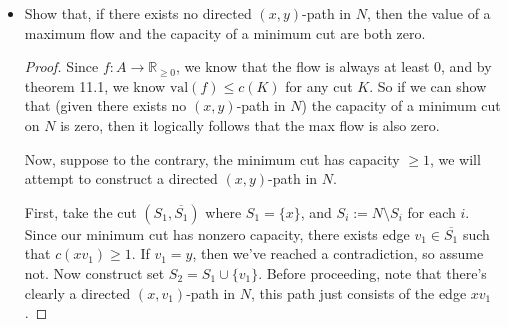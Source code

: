 \documentclass[11pt]{article}
\newcommand{\R}{\mathbb{R}}
\newcommand{\sm}{\scriptsize}
\newcommand\itm[1]{\item[\textbf{#1}]}
\newcommand{\n}{\vspace{0.3cm}}
\begin{document}
\begin{itemize}
\begin{enumerate}[label=(\alph*)]
\begin{center}
{
        }
      \end{center}
    \end{enumerate} \n



  \itm{11.2.2} Show that, if there exists no directed \((x, y)\)-path in \(N\), then the value of a maximum flow and the capacity of a minimum cut are both zero.
  \begin{proof}
    Since \(f \colon A \to \R_{\geq 0}\), we know that the flow is always at least 0, and by theorem 11.1, we know \(\text{val}(f) \leq c(K)\) for any cut \(K\).  So if we can show that (given there exists no \((x,y)\)-path in \(N\)) the capacity of a minimum cut on \(N\) is zero, then it logically follows that the max flow is also zero. \n

    Now, suppose to the contrary, the minimum cut has capacity \(\geq 1\), we will attempt to construct a directed \((x,y)\)-path in \(N\). \n

  First, take the cut \(\left(S_1, \overline{S_1}\right)\) where \(S_1 = \{x\}\), and \(S_i := N \setminus S_i\) for each \(i\).  Since our minimum cut has nonzero capacity, there exists edge \(v_1 \in \overline{S_1}\) such that \(c(xv_1) \geq 1\).  If \(v_1 = y\), then we've reached a contradiction, so assume not.  Now construct set \(S_2 = S_1 \cup \{v_1\}\).  Before proceeding, note that there's clearly a directed \((x,v_1)\)-path in \(N\), this path just consists of the edge \(xv_1\). \n


\end{proof}
\end{itemize}
\end{document}
